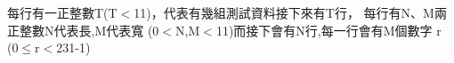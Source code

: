 每行有一正整數T(T$<$11)，代表有幾組測試資料接下來有T行， 每行有N、M兩正整數N代表長,M代表寬 (0$<$N,M$<$11)而接下會有N行,每一行會有M個數字 r (0$\leq$r$<$231-1)
